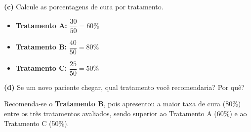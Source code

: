 \documentclass[12pt, a4paper]{article}
\begin{document}
\medskip\noindent\textbf{(c)} Calcule as porcentagens de cura por tratamento.

\begin{itemize}
    \item \textbf{Tratamento A:} $\dfrac{30}{50} = \boxed{60\%}$
    \item \textbf{Tratamento B:} $\dfrac{40}{50} = \boxed{80\%}$
    \item \textbf{Tratamento C:} $\dfrac{25}{50} = \boxed{50\%}$
\end{itemize}

\medskip\noindent\textbf{(d)} Se um novo paciente chegar, qual tratamento você recomendaria? Por quê?

\noindent Recomenda-se o \textbf{Tratamento B}, pois apresentou a maior taxa de cura (80\%) entre os três tratamentos avaliados, sendo superior ao Tratamento A (60\%) e ao Tratamento C (50\%).
\end{document}
